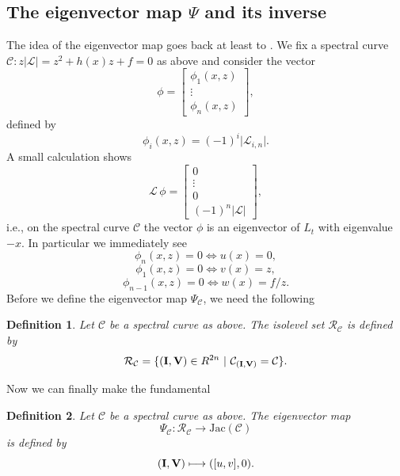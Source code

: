 \documentclass[11pt, a4paper]{amsart}
\newcommand{\jac}{\mathrm{Jac(\mathcal C)}}
\newcommand{\eq}[1]{\begin{equation}#1 \end{equation}}
\newcommand{\eqst}[1]{\begin{equation*}#1\end{equation*}}
\theoremstyle{plain}
\newtheorem{definition}{Definition}[section]
\numberwithin{equation}{section}
\begin{document}
\subsection{The eigenvector map $\Psi$ and its inverse}
The idea of the eigenvector map goes back at least to \cite{vmm}. We fix a spectral curve $\mathcal C : z \vert\mathcal L\vert =  z^2 +h(x) z + f = 0$ as above and consider the vector \eqst{\phi = \begin{bmatrix}\phi_1(x,z) \\ \vdots \\ \phi_n(x,z)\end{bmatrix},} defined by \eqst{\phi_i(x,z) = (-1)^{i} \vert \mathcal L _{i,n} \vert.} A small calculation 
shows \eqst{\mathcal L \, \phi = \begin{bmatrix} 0 \\ \vdots \\ 0 \\ (-1)^{n} \vert \mathcal L \vert\end{bmatrix} ,}i.e., on the spectral curve $\mathcal C$ the vector $\phi$ is an eigenvector of $L_t$ with eigenvalue $-x$. In particular 
we immediately see \eq{\label{equ} \phi_n(x,z) = 0 \iff u(x)=0,} \eq{\label{eqv} \phi_1(x,z) = 0 \iff v(x)  = z,}  \eqst{\phi_{n-1}(x,z) = 0 \iff w(x) = f/z.}
Before we define the eigenvector map $\Psi_\mathcal C$, we need the following
\begin{definition}
\label{isolevelset}
Let $\mathcal C$ be a spectral curve as above. The isolevel set $\mathcal R _\mathcal C$ is defined by \eqst{\mathcal R _{\mathcal C} = \{ (\bold{I},\bold{V}) \in R^{2n} \ \vert \ \mathcal C_{(\bold{I},\bold{V})} = \mathcal C \}.}  
\end{definition}
\noindent Now we can finally make the fundamental
\begin{definition}
\label{defspectral}
Let $\mathcal C$ be a spectral curve as above. The eigenvector map \eqst{\Psi_\mathcal C:\mathcal R _\mathcal C
\longrightarrow \jac} is defined by \eqst{(\bold I,\bold V)
\longmapsto ([u,v],0).}
\end{definition}
\end{document}
